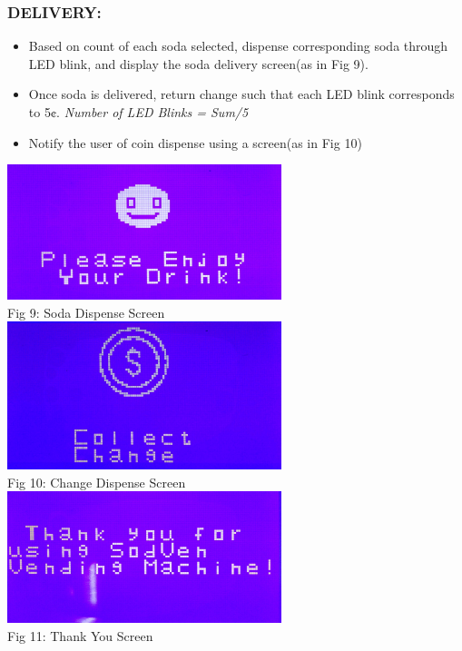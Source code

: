 \documentclass{article}
\begin{document}
\subsubsection{DELIVERY:}
\begin{itemize}
    \item Based on count of each soda selected, dispense corresponding soda through LED blink, and display the soda delivery screen(as in Fig 9).
    \item Once soda is delivered, return change such that each LED blink corresponds to 5¢. \textit{Number of LED Blinks = Sum/5}
    \item Notify the user of coin dispense using a screen(as in Fig 10)
\end{itemize}
\begin{center}
   \includegraphics[width=8cm]{enjoydrink}
   \\Fig 9: Soda Dispense Screen
   \\[2\baselineskip]
   \includegraphics[width=8cm]{collectchange}
   \\Fig 10: Change Dispense Screen
   \\[2\baselineskip]
    \includegraphics[width=8cm]{thanku}
   \\Fig 11: Thank You Screen
   \\[2\baselineskip]
 \end{center}
\end{document}
